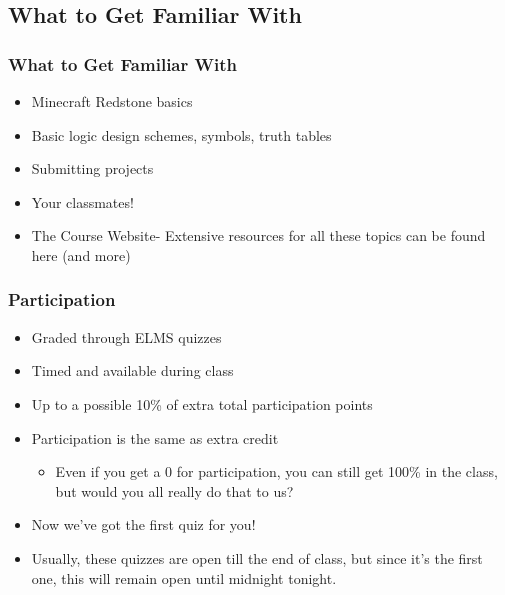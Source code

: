 \documentclass{beamer}
\begin{document}
        \subsection{What to Get Familiar With}
        
            \begin{frame}
                \frametitle{What to Get Familiar With}
                    \begin{itemize}
                        \item Minecraft Redstone basics
                        \item Basic logic design schemes, symbols, truth tables
                        \item Submitting projects
                        \item Your classmates!
                        \item The Course Website- Extensive resources for all these topics can be found here (and more)
                    \end{itemize}
            \end{frame}
            
            \begin{frame}
                \frametitle{Participation}
                    \begin{itemize}
                        \item Graded through ELMS quizzes
                        \item Timed and available during class
                        \item Up to a possible 10\% of extra total participation points
                        \item Participation is the same as extra credit
                            \begin{itemize}
                                \item Even if you get a 0 for participation, you can still get 100\% in the class, but would you all really do that to us?
                            \end{itemize}
                        \item Now we've got the first quiz for you!
                        \item Usually, these quizzes are open till the end of class, but since it's the first one, this will remain open until midnight tonight.
                    \end{itemize}
            \end{frame}
            
\end{document}
